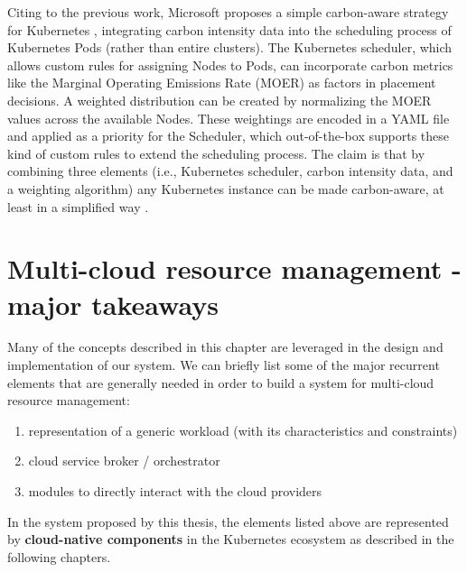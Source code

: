 Citing to the previous work, Microsoft proposes a simple carbon-aware strategy for Kubernetes \cite{microsoft_carbon_aware_k8s}, integrating carbon intensity data into the scheduling process of Kubernetes Pods (rather than entire clusters).
The Kubernetes scheduler, which allows custom rules for assigning Nodes to Pods, can incorporate carbon metrics like the Marginal Operating Emissions Rate (MOER) as factors in placement decisions. 
A weighted distribution can be created by normalizing the MOER values across the available Nodes.
These weightings are encoded in a YAML file and applied as a priority for the Scheduler, which out-of-the-box supports these kind of custom rules to extend the scheduling process.
The claim is that by combining three elements (i.e., Kubernetes scheduler, carbon intensity data, and a weighting algorithm) any Kubernetes instance can be made carbon-aware, at least in a simplified way \cite{microsoft_carbon_aware_k8s}.

\section{Multi-cloud resource management - major takeaways}

Many of the concepts described in this chapter are leveraged in the design and implementation of our system. 
We can briefly list some of the major recurrent elements that are generally needed in order to build a system for multi-cloud resource management:
\begin{enumerate}
    \item representation of a generic workload (with its characteristics and constraints)
    \item cloud service broker / orchestrator
    \item modules to directly interact with the cloud providers
\end{enumerate}

In the system proposed by this thesis, the elements listed above are represented by \textbf{cloud-native components} in the Kubernetes ecosystem as described in the following chapters.

\newpage
